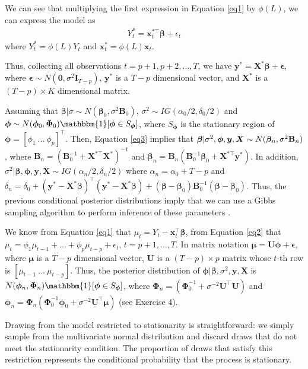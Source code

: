 We can see that multiplying the first expression in Equation \ref{eq1} by $\phi(L)$, we can express the model as 
\begin{align}\label{eq3}
	Y_t^*=\bm{x}_t^{*\top}\bm{\beta}+\epsilon_t
\end{align}
where $Y_t^*=\phi(L)Y_t$ and $\bm{x}_t^{*}=\phi(L)\bm{x}_t$.

Thus, collecting all observations $t=p+1,p+2,\dots,T$, we have $\bm{y}^*=\bm{X}^*\bm{\beta}+\bm{\epsilon}$, where $\bm{\epsilon}\sim N(\bm{0},\sigma^2\bm{I}_{T-p})$, $\bm{y}^*$ is a $T-p$ dimensional vector, and $\bm{X}^*$ is a $(T-p)\times K$ dimensional matrix.

Assuming that $\bm{\beta}|\sigma\sim N(\bm{\beta}_0,\sigma^2\bm{B}_0)$, $\sigma^2\sim IG(\alpha_0/2,\delta_0/2)$ and $\bm{\phi}\sim N(\bm{\phi}_0,\bm{\Phi}_0)\mathbbm{1}[\bm{\phi}\in S_{\bm{\phi}}]$, where $S_{\bm{\phi}}$ is the stationary region of $\bm{\phi}=[\phi_1 \ \dots \ \phi_p]^{\top}$. Then, Equation \ref{eq3} implies that $\bm{\beta}|\sigma^2,\bm{\phi},\bm{y},\bm{X}\sim N(\bm{\beta}_n, \sigma^2{\bf{B}}_n)$, where $\bm{B}_n = (\bm{B}_0^{-1} + \bm{X}^{*\top}\bm{X}^{*})^{-1}$ and $\bm{\beta}_n = \bm{B}_n(\bm{B}_0^{-1}\bm{\beta}_0 + \bm{X}^{*\top}\bm{y}^{*})$. In addition, $\sigma^2|\bm{\beta},\bm{\phi},\bm{y},\bm{X}\sim IG(\alpha_n/2,\delta_n/2)$ where $\alpha_n=\alpha_0+T-p$ and $\delta_n=\delta_0+(\bm{y}^*-\bm{X}^{*}\bm{\beta})^{\top}(\bm{y}^*-\bm{X}^{*}\bm{\beta})+(\bm{\beta}-\bm{\beta}_0)\bm{B}_0^{-1}(\bm{\beta}-\bm{\beta}_0)$. Thus, the previous conditional posterior distributions imply that we can use a Gibbs sampling algorithm to perform inference of these parameters \cite{chib1993bayes}.

We know from Equation \ref{eq1} that $\mu_t=Y_t-\bm{x}_t^{\top}\bm{\beta}$, from Equation \ref{eq2} that $\mu_t=\phi_1\mu_{t-1}+\dots+\phi_p\mu_{t-p}+\epsilon_t$, $t=p+1,\dots,T$. In matrix notation $\bm{\mu}=\bm{U}\bm{\phi}+\bm{\epsilon}$, where $\bm{\mu}$ is a $T-p$ dimensional vector, $\bm{U}$ is a $(T-p)\times p$ matrix whose $t$-th row is $[\mu_{t-1} \ \dots \ \mu_{t-p}]$. Thus, the posterior distribution of $\bm{\phi}|\bm{\beta},\sigma^2,\bm{y},\bm{X}$ is $N(\bm{\phi}_n, \bm{\Phi}_n)\mathbbm{1}[\bm{\phi}\in S_{\bm{\phi}}]$, where $\bm{\Phi}_n=(\bm{\Phi}_0^{-1}+\sigma^{-2}\bm{U}^{\top}\bm{U})$ and $\bm{\phi}_n=\bm{\Phi}_n(\bm{\Phi}_0^{-1}\bm{\phi}_0+\sigma^{-2}\bm{U}^{\top}\bm{\mu})$ (see Exercise 4).

Drawing from the model restricted to stationarity is straightforward: we simply sample from the multivariate normal distribution and discard draws that do not meet the stationarity condition. The proportion of draws that satisfy this restriction represents the conditional probability that the process is stationary.\\


